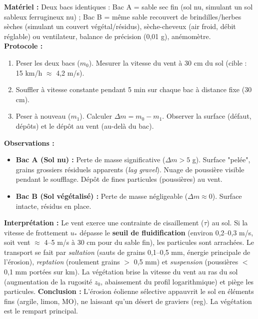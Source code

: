 \documentclass[11pt]{article}
\begin{document}
\begin{experience}
\textbf{Matériel :} Deux bacs identiques : Bac A = sable sec fin (sol nu, simulant un sol sableux ferrugineux nu) ; Bac B = même sable recouvert de brindilles/herbes sèches (simulant un couvert végétal/résidus), sèche-cheveux (air froid, débit réglable) ou ventilateur, balance de précision (0,01 g), anémomètre.\\
\textbf{Protocole :}
\begin{enumerate}
    \item Peser les deux bacs ($m_0$). Mesurer la vitesse du vent à 30 cm du sol (cible : 15 km/h $\approx$ 4,2 m/s).
    \item Souffler à vitesse constante pendant 5 min sur chaque bac à distance fixe (30 cm).
    \item Peser à nouveau ($m_1$). Calculer $\Delta m = m_0 - m_1$. Observer la surface (défaut, dépôts) et le dépôt au vent (au-delà du bac).
\end{enumerate}
\textbf{Observations :}
\begin{itemize}
    \item \textbf{Bac A (Sol nu) :} Perte de masse significative ($\Delta m > 5$ g). Surface "pelée", grains grossiers résiduels apparents (\emph{lag gravel}). Nuage de poussière visible pendant le soufflage. Dépôt de fines particules (poussières) au vent.
    \item \textbf{Bac B (Sol végétalisé) :} Perte de masse négligeable ($\Delta m \approx 0$). Surface intacte, résidus en place.
\end{itemize}
\textbf{Interprétation :} Le vent exerce une contrainte de cisaillement ($\tau$) au sol. Si la vitesse de frottement $u_*$ dépasse le \textbf{seuil de fluidification} (environ 0,2--0,3 m/s, soit vent $\approx$ 4--5 m/s à 30 cm pour du sable fin), les particules sont arrachées. Le transport se fait par \emph{saltation} (sauts de grains 0,1--0,5 mm, énergie principale de l'érosion), \emph{reptation} (roulement grains $>$ 0,5 mm) et \emph{suspension} (poussières $<$ 0,1 mm portées sur km). La végétation brise la vitesse du vent au ras du sol (augmentation de la rugosité $z_0$, abaissement du profil logarithmique) et piège les particules.
\textbf{Conclusion :} L'érosion éolienne sélective appauvrit le sol en éléments fins (argile, limon, MO), ne laissant qu'un désert de graviers (reg). La végétation est le rempart principal.
\end{experience}
\end{document}
